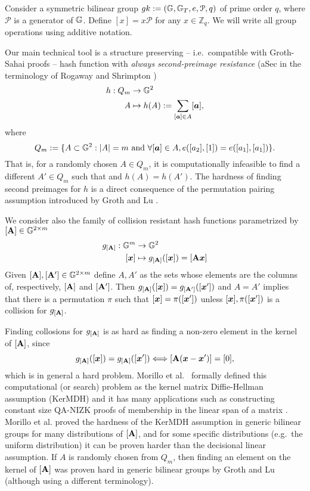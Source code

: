 Consider a symmetric bilinear group $gk:=(\mathbb{G},\mathbb{G}_T,e,\mathcal{P},q)$ of prime order $q$, where $\mathcal{P}$ is a generator of $\mathbb{G}$. Define $[x]=x\mathcal{P}$ for any $x\in\mathbb{Z}_q$.  We will write all group operations using additive notation.

Our main technical tool is a structure preserving -- i.e.~compatible with Groth-Sahai proofs -- hash function with \emph{always second-preimage resistance} (aSec in the terminology of Rogaway and Shrimpton \cite{FSE:RogShr04})
\begin{align*}
h : Q_m &\to \mathbb{G}^2\\
      A &\mapsto h(A) := \sum_{[{\boldsymbol{a}}]\in A} [{\boldsymbol{a}}],
\end{align*}
 where
$$
Q_m:= \{A\subset\mathbb{G}^2: |A|=m \text{ and }\forall [{\boldsymbol{a}}]\in A, e([a_2],[1])=e([a_1],[a_1])\}.
$$
That is, for a randomly chosen $A\in Q_m$, it is computationally infeasible to find a different $A'\in Q_m$ such that and $h(A)=h(A')$. The hardness of finding second preimages for $h$ is a direct consequence of the permutation pairing assumption introduced by Groth and Lu \cite{AC:GroLu07}.

We consider also the family of collision resistant hash functions parametrized by $[\mathbf{{A}}]\in\mathbb{G}^{2\times m}$
\begin{align*}
g_{[\matr{A}]} : \GG^m &\to \GG^2\\
           [\vecb{x}] &\mapsto g_{[\matr{A}]}([\vecb{x}]) = [\matr{A}\vecb{x}]
\end{align*}
Given $[\mathbf{{A}}],[\mathbf{{A}}']\in\mathbb{G}^{2\times m}$ define $A,A'$ as the sets whose elements are the columns of, respectively, $[\mathbf{{A}}]$ and $[\mathbf{{A}}']$. Then $g_{[\mathbf{{A}}]}([{\boldsymbol{x}}]) = g_{[\mathbf{{A}}']}([{\boldsymbol{x}}'])$ and $A=A'$ implies that there is a permutation $\pi$ such that $[{\boldsymbol{x}}]=\pi([{\boldsymbol{x}}'])$ unless $[{\boldsymbol{x}}],\pi([{\boldsymbol{x}}'])$ is a collision for $g_{[\mathbf{{A}}]}$.
 
 Finding collosions for $g_{[\mathbf{{A}}]}$ is as hard as finding a non-zero element in the kernel of $[\mathbf{{A}}]$, since
$$
g_{[\mathbf{{A}}]}([{\boldsymbol{x}}]) = g_{[\mathbf{{A}}]}([{\boldsymbol{x}}']) \Longleftrightarrow [\mathbf{{A}}({\boldsymbol{x}}-{\boldsymbol{x}}')]=[0],
$$
which is in general a hard problem.
Morillo et al.~\cite{AC:MorRafVil16} formally defined this computational (or search) problem as the kernel matrix Diffie-Hellman assumption (KerMDH) and it has many applications such as constructing constant size QA-NIZK proofs of membership in the linear span of a matrix \cite{EC:LPJY14,EC:KilWee15}. Morillo et al. proved the hardness of the KerMDH assumption in generic bilinear groups for many distributions of $[\mathbf{{A}}]$, and for some specific distributions (e.g.~the uniform distribution) it can be proven harder than the decisional linear assumption. If $A$ is randomly chosen from $Q_m$, then finding an element on the kernel of $[\mathbf{{A}}]$ was proven hard in generic bilinear groups by Groth and Lu \cite{AC:GroLu07} (although using a different terminology).

